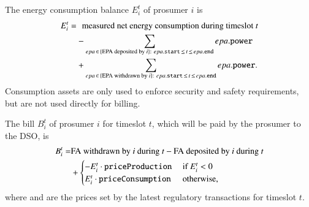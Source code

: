 The energy consumption balance $E_i^t$ of prosumer $i$ is
\begin{align*}
E_i^t = & \hphantom{+} \text{measured net energy consumption during timeslot } t \\ %
 & - \sum_{epa \,\in\, \{\text{EPA deposited by } i\}: ~ epa.\field{start} \,\leq\, t \,\leq\, epa.\field{end}} epa.\field{power} \\
 & + \sum_{epa \,\in\, \{\text{EPA withdrawn by } i\}: ~ epa.\field{start} \,\leq\, t \,\leq\, epa.\field{end}} epa.\field{power} .
\end{align*}
Consumption assets are only used to enforce security and safety
requirements, but are not used directly for billing.

The bill $B_i^t$ of prosumer $i$ for timeslot $t$, which will be paid
by the prosumer to the DSO, is
\begin{align*}
B_i^t = &  \text{FA withdrawn by $i$ during $t$} - \text{FA deposited by $i$ during $t$} \\
 & + \begin{cases}
- E_i^t \cdot \texttt{priceProduction} & \text{ if } E_i^t < 0 \\
 E_i^t \cdot \texttt{priceConsumption} & \text{ otherwise,} 
\end{cases}
\end{align*}
where {} and {} are the
prices set by the latest regulatory transactions for timeslot $t$. 

